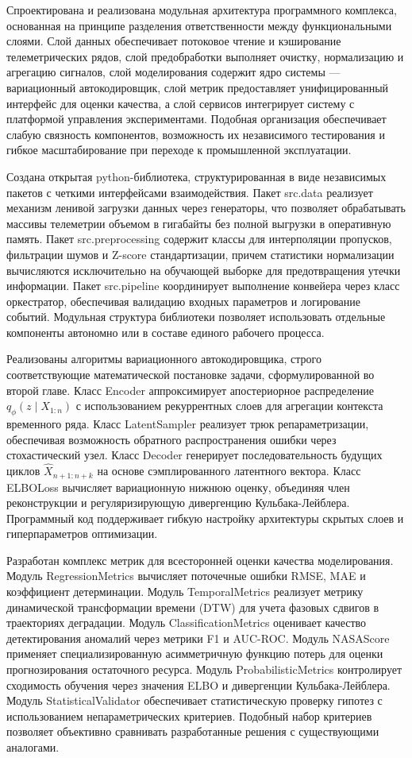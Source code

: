 \documentclass[14pt, a4paper, oneside]{extreport}
\begin{document}
Спроектирована и реализована модульная архитектура программного комплекса, основанная на принципе разделения ответственности между функциональными слоями. Слой данных обеспечивает потоковое чтение и кэширование телеметрических рядов, слой предобработки выполняет очистку, нормализацию и агрегацию сигналов, слой моделирования содержит ядро системы — вариационный автокодировщик, слой метрик предоставляет унифицированный интерфейс для оценки качества, а слой сервисов интегрирует систему с платформой управления экспериментами. Подобная организация обеспечивает слабую связность компонентов, возможность их независимого тестирования и гибкое масштабирование при переходе к промышленной эксплуатации.

Создана открытая python-библиотека, структурированная в виде независимых пакетов с четкими интерфейсами взаимодействия. Пакет {src.data} реализует механизм ленивой загрузки данных через генераторы, что позволяет обрабатывать массивы телеметрии объемом в гигабайты без полной выгрузки в оперативную память. Пакет {src.preprocessing} содержит классы для интерполяции пропусков, фильтрации шумов и Z-score стандартизации, причем статистики нормализации вычисляются исключительно на обучающей выборке для предотвращения утечки информации. Пакет {src.pipeline} координирует выполнение конвейера через класс оркестратор, обеспечивая валидацию входных параметров и логирование событий. Модульная структура библиотеки позволяет использовать отдельные компоненты автономно или в составе единого рабочего процесса.

Реализованы алгоритмы вариационного автокодировщика, строго соответствующие математической постановке задачи, сформулированной во второй главе. Класс {Encoder} аппроксимирует апостериорное распределение $q_\phi(z \mid X_{1:n})$ с использованием рекуррентных слоев для агрегации контекста временного ряда. Класс {LatentSampler} реализует трюк репараметризации, обеспечивая возможность обратного распространения ошибки через стохастический узел. Класс {Decoder} генерирует последовательность будущих циклов $\hat{X}_{n+1:n+k}$ на основе сэмплированного латентного вектора. Класс {ELBOLoss} вычисляет вариационную нижнюю оценку, объединяя член реконструкции и регуляризирующую дивергенцию Кульбака-Лейблера. Программный код поддерживает гибкую настройку архитектуры скрытых слоев и гиперпараметров оптимизации.

Разработан комплекс метрик для всесторонней оценки качества моделирования. Модуль {RegressionMetrics} вычисляет поточечные ошибки RMSE, MAE и коэффициент детерминации. Модуль {TemporalMetrics} реализует метрику динамической трансформации времени (DTW) для учета фазовых сдвигов в траекториях деградации. Модуль {ClassificationMetrics} оценивает качество детектирования аномалий через метрики F1 и AUC-ROC. Модуль {NASAScore} применяет специализированную асимметричную функцию потерь для оценки прогнозирования остаточного ресурса. Модуль {ProbabilisticMetrics} контролирует сходимость обучения через значения ELBO и дивергенции Кульбака-Лейблера. Модуль {StatisticalValidator} обеспечивает статистическую проверку гипотез с использованием непараметрических критериев. Подобный набор критериев позволяет объективно сравнивать разработанные решения с существующими аналогами.
\end{document}
